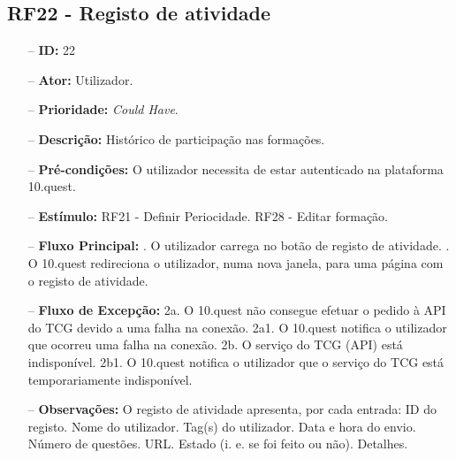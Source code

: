\subsection{RF22 - Registo de atividade}
\begin{itemize}
	\item[--] \textbf{ID:} 22
	\item[--]  \textbf{Ator:} Utilizador.
	\item[--]  \textbf{Prioridade:} \textit{Could Have}.
	\item[--]  \textbf{Descrição:} Histórico de participação nas formações.
	\item[--]  \textbf{Pré-condições:} O utilizador necessita de estar autenticado na plataforma 10.quest.
	\item[--]  \textbf{Estímulo:}
		\subitem RF21 - Definir Periocidade.
		\subitem RF28 - Editar formação.
	\item[--]  \textbf{Fluxo Principal:} 
		. O utilizador carrega no botão de registo de atividade.
		. O 10.quest redireciona o utilizador, numa nova janela, para uma página com o registo de atividade.
	\item[--]  \textbf{Fluxo de Excepção:} 
		\subitem 2a. O 10.quest não consegue efetuar o pedido à API do TCG devido a uma falha na conexão.
		\subitem 2a1. O 10.quest notifica o utilizador que ocorreu uma falha na conexão.
		\subitem 2b. O serviço do TCG (API) está indisponível.
		\subitem 2b1. O 10.quest notifica o utilizador que o serviço do TCG está temporariamente indisponível. 
	\item[--]  \textbf{Observações:} O registo de atividade apresenta, por cada entrada:
		\subitem ID do registo.
		\subitem Nome do utilizador.
		\subitem Tag(s) do utilizador.
		\subitem Data e hora do envio.
		\subitem Número de questões.
		\subitem URL.
		\subitem Estado (i. e. se foi feito ou não).
		\subitem Detalhes.
\end{itemize}
\newpage

